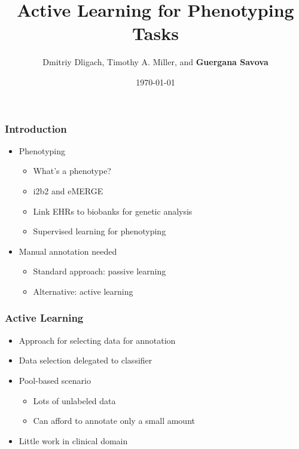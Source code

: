 \documentclass{beamer}
\title[Active Learning for Phenotyping Tasks\hspace{2em}\insertframenumber/\inserttotalframenumber]
{Active Learning for Phenotyping Tasks}
\author{Dmitriy Dligach, Timothy A. Miller, and \textbf{Guergana Savova}}
\institute{Boston Children's Hosptial and Harvard Medical School}
\date{\today}
\begin{document}

\begin{frame}[t]                                                                                              
\titlepage                                                                                                    
\end{frame}  

\begin{frame}
\frametitle{Introduction}
\begin{itemize}
\item Phenotyping
\begin{itemize}
\item What's a phenotype?
\item i2b2 and eMERGE
\item Link EHRs to biobanks for genetic analysis
\item Supervised learning for phenotyping
\end{itemize}
\item Manual annotation needed
\begin{itemize}
\item Standard approach: passive learning
\item Alternative: active learning
\end{itemize}
\end{itemize}
\end{frame}

\begin{frame}
\frametitle{Active Learning}
\begin{itemize}
\item Approach for selecting data for annotation
\item Data selection delegated to classifier
\item Pool-based scenario
\begin{itemize}
\item Lots of unlabeled data
\item Can afford to annotate only a small amount
\end{itemize}
\item Little work in clinical domain
\end{itemize}
\end{frame}
\end{document}
